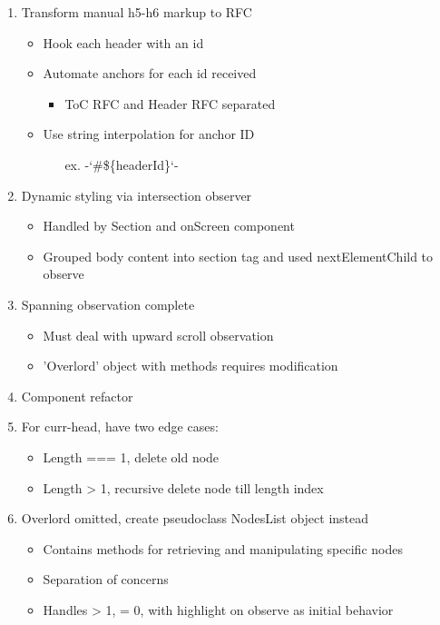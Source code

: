 \documentclass[7px]{article}
\begin{document}
\deploy
{
  \small
  \begin{enumerate}[label=$\multimapinv$]
    \item Transform manual h5-h6 markup to RFC
      \begin{itemize}[label=$\multimapdot$, leftmargin=1.7mm]
        \item Hook each header with an id
        \item Automate anchors for each id received
          \begin{itemize}
            \item ToC RFC and Header RFC separated
          \end{itemize}
        \item Use string interpolation for anchor ID
          \begin{itemize}
            \item[ex.] -`\#\$\{headerId\}`-
          \end{itemize}
      \end{itemize}
    \item Dynamic styling via intersection observer
      \begin{itemize}[label=$\multimapdot$, leftmargin=1.7mm]
        \item Handled by Section and onScreen component
        \item Grouped body content into section tag and used nextElementChild to observe
      \end{itemize}
    \item Spanning observation complete
      \begin{itemize}
        \item Must deal with upward scroll observation
        \item 'Overlord' object with methods requires modification
      \end{itemize}
    \item Component refactor
    \item For curr-head, have two edge cases:
      \begin{itemize}
        \item Length === 1, delete old node
        \item Length > 1, recursive delete node till length index
      \end{itemize}
    \item Overlord omitted, create pseudoclass NodesList object instead
      \begin{itemize}[label=$\multimapdot$, leftmargin=1.7mm]
        \item Contains methods for retrieving and manipulating specific nodes
        \item Separation of concerns
        \item Handles > 1, = 0, with highlight on observe as initial behavior 
      \end{itemize}
  \end{enumerate}
  \small
}
\end{document}
